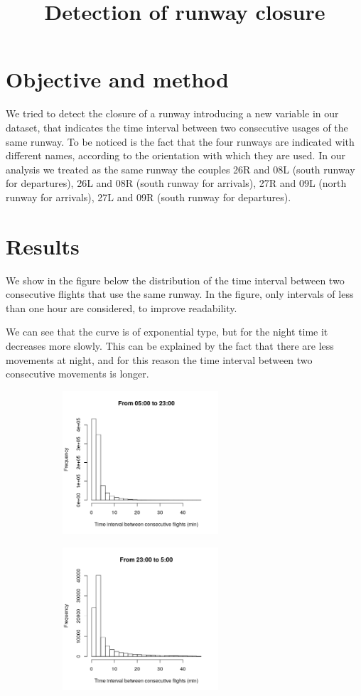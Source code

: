 \documentclass{article}
\begin{document}
	
	\title{Detection of runway closure}
	\maketitle

\section{Objective and method}
We tried to detect the closure of a runway introducing a new variable in our dataset, that indicates the time interval between two consecutive usages of the same runway. To be noticed is the fact that the four runways are indicated with different names, according to the orientation with which they are used. In our analysis we treated as the same runway the couples 26R and 08L (south runway for departures), 26L and 08R (south runway for arrivals), 27R and 09L (north runway for arrivals), 27L and 09R (south runway for departures).
\section{Results}
We show in the figure below the distribution of the time interval between two consecutive flights that use the same runway. In the figure, only intervals of less than one hour are considered, to improve readability.

We can see that the curve is of exponential type, but for the night time it decreases more slowly. This can be explained by the fact that there are less movements at night, and for this reason the time interval between two consecutive movements is longer.

\begin{figure}[h]
	\centering
	\begin{subfigure}[b]{.49\textwidth}
		\centering
		\includegraphics[width=5.8cm]{day.png}
		\label{day}
	\end{subfigure}%
	\begin{subfigure}[b]{.49\textwidth}
		\centering
		\includegraphics[width=5.8cm]{night.png}
		
		\label{night}
	\end{subfigure}
\end{figure}
\end{document}
